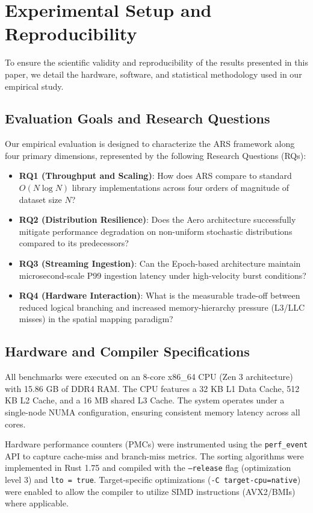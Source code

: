 \section{Experimental Setup and Reproducibility} \label{sec:experimental_setup}
To ensure the scientific validity and reproducibility of the results presented in this paper, we detail the hardware, software, and statistical methodology used in our empirical study.

\subsection{Evaluation Goals and Research Questions}
Our empirical evaluation is designed to characterize the ARS framework along four primary dimensions, represented by the following Research Questions (RQs):

\begin{itemize}
    \item \textbf{RQ1 (Throughput and Scaling)}: How does ARS compare to standard $O(N \log N)$ library implementations across four orders of magnitude of dataset size $N$?
    \item \textbf{RQ2 (Distribution Resilience)}: Does the Aero architecture successfully mitigate performance degradation on non-uniform stochastic distributions compared to its predecessors?
    \item \textbf{RQ3 (Streaming Ingestion)}: Can the Epoch-based architecture maintain microsecond-scale P99 ingestion latency under high-velocity burst conditions?
    \item \textbf{RQ4 (Hardware Interaction)}: What is the measurable trade-off between reduced logical branching and increased memory-hierarchy pressure (L3/LLC misses) in the spatial mapping paradigm?
\end{itemize}

\subsection{Hardware and Compiler Specifications}
All benchmarks were executed on an 8-core x86\_64 CPU (Zen 3 architecture) with 15.86 GB of DDR4 RAM. The CPU features a 32 KB L1 Data Cache, 512 KB L2 Cache, and a 16 MB shared L3 Cache. The system operates under a single-node NUMA configuration, ensuring consistent memory latency across all cores. 

Hardware performance counters (PMCs) were instrumented using the \texttt{perf\_event} API to capture cache-miss and branch-miss metrics. The sorting algorithms were implemented in Rust 1.75 and compiled with the \texttt{--release} flag (optimization level 3) and \texttt{lto = true}. Target-specific optimizations (\texttt{-C target-cpu=native}) were enabled to allow the compiler to utilize SIMD instructions (AVX2/BMIs) where applicable.


